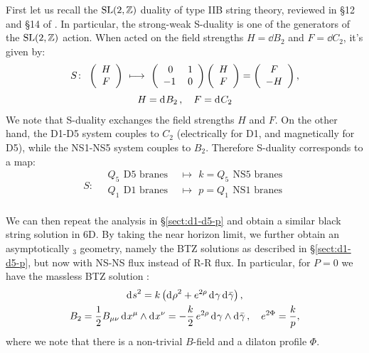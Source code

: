 \documentclass[11pt,a4paper]{article}
\newcommand{\ads}[1]{\text{AdS}\ensuremath{_{#1}}}
\begin{document}
	First let us recall the $\mathrm{SL}(2,\mathbb{Z})$ duality of type IIB string theory, reviewed in \S12 and \S14 of \cite{Polchinski:1998rr}. In particular, the strong-weak S-duality is one of the generators of the $\mathrm{SL}(2,\mathbb{Z})$ action. When acted on the field strengths $H = \dd{B_2}$ and $F = \dd{C_2}$, it's given by:
	\begin{gather}
		S\colon\ %
		\pqty{\begin{array}{c} H \\ F \end{array}}
		\ \longmapsto\ %
		\pqty{\begin{array}{cc}
			0 & 1 \\
			-1\hspace*{.2em} & 0
		\end{array}}
		\pqty{\begin{array}{c} H \\ F \end{array}}
		= \pqty{\begin{array}{c} F \\ -H \end{array}},
	\\[.5ex]
		H = \dd{B_2},\quad F = \dd{C_2} \nonumber
	\end{gather}
	We note that S-duality exchanges the field strengths $H$ and $F$. On the other hand, the D1-D5 system couples to $C_2$ (electrically for D1, and magnetically for D5), while the NS1-NS5 system couples to $B_2$. Therefore S-duality corresponds to a map:
	\begin{equation}
	S\colon\quad
	\begin{aligned}
		Q_5\ \,\text{D5 branes}
		\ \,&\longmapsto\ \,
		k = Q_5\ \,\text{NS5 branes} \\
		Q_1\ \,\text{D1 branes}
		\ \,&\longmapsto\ \,
		p = Q_1\ \,\text{NS1 branes} \\
	\end{aligned}
	\end{equation}
	
	We can then repeat the analysis in \S\ref{sect:d1-d5-p} and obtain a similar black string solution in 6D. By taking the near horizon limit, we further obtain an asymptotically \ads{3} geometry, namely the BTZ solutions as described in \S\ref{sect:d1-d5-p}, but now with NS-NS flux instead of R-R flux. In particular, for $P = 0$ we have the massless BTZ solution \needcites:
	\begin{gather}
		\mathinner{\mathrm{d}^{}s}^2
		= k \left(
			\mathinner{\mathrm{d}^{}\rho}^2
			+ e^{2\rho} \mathinner{\mathrm{d}^{}\gamma} \mathinner{\mathrm{d}^{}\bar{\gamma}}
		\right),
	\\
		B_2 = \frac{1}{2} B_{\mu\nu}
				\mathinner{\mathrm{d}^{}x^\mu} \wedge \mathinner{\mathrm{d}^{}x^\nu}
		= - \frac{k}{2}\,e^{2\rho}
				\mathinner{\mathrm{d}^{}\gamma} \wedge \mathinner{\mathrm{d}^{}\bar{\gamma}},
	\quad e^{2\Phi} = \frac{k}{p},
	\end{gather}
	where we note that there is a non-trivial $B$-field and a dilaton profile $\Phi$. 
	
\end{document}
